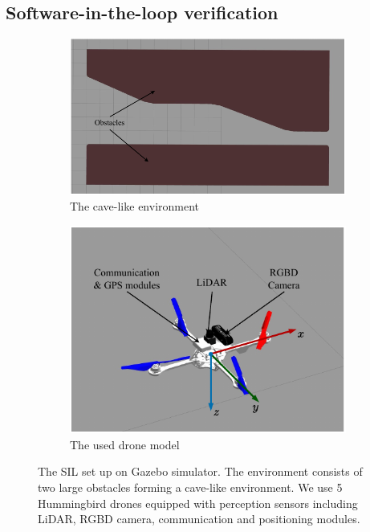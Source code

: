 \subsection{Software-in-the-loop verification}
\begin{figure}
    \centering
    \begin{subfigure}[b]{0.56\textwidth}
    \includegraphics[width=\textwidth]{paper3/images/tunnel.pdf}
    \caption{The cave-like environment}
    \label{fig:gazebo_tunnel}
    \end{subfigure}
    \begin{subfigure}[b]{0.42\textwidth}
    \includegraphics[width=\textwidth]{paper3/images/hummingbird.pdf}
    \caption{The used drone model~\cite{Bui2022,Furrer2016}}
    \label{fig:gazebo_hummingbird}
    \end{subfigure}
    \caption{The SIL set up on Gazebo simulator. The environment consists of two large obstacles forming a cave-like environment. We use 5 Hummingbird drones equipped with perception sensors including LiDAR, RGBD camera, communication and positioning modules.}
    \label{fig:sil}
\end{figure}
